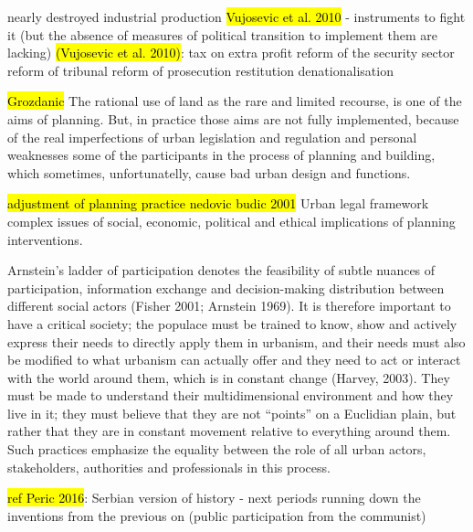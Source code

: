 \documentclass[11pt]{report}
\begin{document}
nearly destroyed industrial production \hl{Vujosevic et al. 2010}
- instruments to fight it (but the absence of measures of political transition to implement them are lacking) \hl{(Vujosevic et al. 2010)}:
        tax on extra profit
        reform of the security sector
        reform of tribunal
        reform of prosecution
        restitution
        denationalisation  

\hl{Grozdanic}
The rational use of land as the rare and limited recourse, is one of the aims of planning. But, in practice those aims are  not  fully  implemented, because  of  the  real  imperfections  of  urban  legislation  and regulation and personal weaknesses some of the participants in the process of planning and building, which sometimes, unfortunatelly, cause bad urban design and functions.

\hl{adjustment of planning practice nedovic budic 2001}   
Urban legal framework complex issues of social, economic, political and ethical implications of planning interventions.

Arnstein’s ladder of participation denotes the feasibility of subtle nuances of participation, information exchange and decision-making distribution between different social actors (Fisher 2001; Arnstein 1969).  
It is therefore important to have a critical society; the populace must be trained to know, show and actively express their needs to directly apply them in urbanism, and their needs must also be modified to what urbanism can actually offer and they need to act or interact with the world around them, which is in constant change (Harvey, 2003).  They must be made to understand their multidimensional environment and how they live in it; they must believe that they are not “points” on a Euclidian plain, but rather that they are in constant movement relative to everything around them. Such practices emphasize the equality between the role of all urban actors, stakeholders, authorities and professionals in this process.

\hl{ref Peric 2016}:
Serbian version of history - next periods running down the inventions from the previous on (public participation from the communist)
\end{document}

